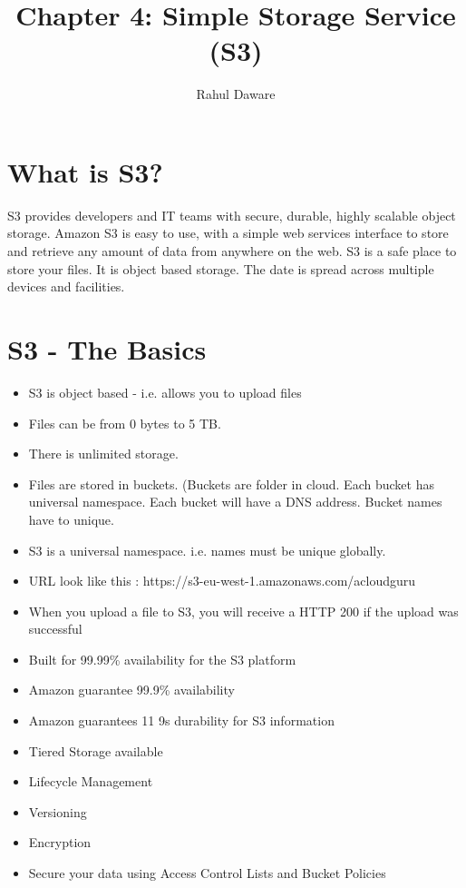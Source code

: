 \documentclass{article}
\author{Rahul Daware}
\begin{document}
\title{Chapter 4: Simple Storage Service (S3)}
\maketitle
\newpage
\tableofcontents
\newpage

\section{What is S3?}
S3 provides developers and IT teams with secure, durable, highly scalable object storage. Amazon S3 is easy to use, with a simple web services interface to store and retrieve any amount of data from anywhere on the web. S3 is a safe place to store your files. It is object based storage. The date is spread across multiple devices and facilities.

\section{S3 - The Basics}
\begin{itemize}
\item
S3 is object based - i.e. allows you to upload files

\item
Files can be from 0 bytes to 5 TB.

\item
There is unlimited storage.

\item
Files are stored in buckets. (Buckets are folder in cloud. Each bucket has universal namespace. Each bucket will have a DNS address. Bucket names have to unique.

\item
S3 is a universal namespace. i.e. names must be unique globally.

\item
URL look like this : https://s3-eu-west-1.amazonaws.com/acloudguru

\item
When you upload a file to S3, you will receive a HTTP 200 if the upload was successful

\item
Built for 99.99\% availability for the S3 platform

\item
Amazon guarantee 99.9\% availability

\item
Amazon guarantees 11 9s durability for S3 information

\item
Tiered Storage available

\item
Lifecycle Management

\item
Versioning

\item
Encryption

\item
Secure your data using Access Control Lists and Bucket Policies

\end{itemize}
\end{document}
